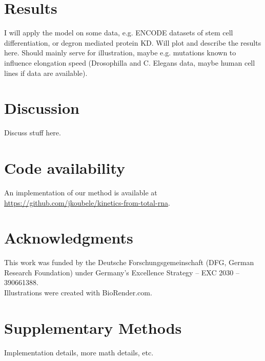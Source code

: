 \documentclass[11pt]{article}
\begin{document}
    \section{Results}
    I will apply the model on some data, e.g. ENCODE datasets of stem cell differentiation, or degron mediated protein KD. Will plot and describe the results here. Should mainly serve for illustration, maybe e.g. mutations known to influence elongation speed (Drosophilla and C. Elegans data, maybe human cell lines if data are available).
 

    \section{Discussion}
    Discuss stuff here.



    \section*{Code availability}
    An implementation of our method is available at \url{https://github.com/jkoubele/kinetics-from-total-rna}.


    \section*{Acknowledgments}
    This work was funded by the Deutsche Forschungsgemeinschaft (DFG, German Research Foundation)
    under Germany's Excellence Strategy – EXC 2030 – 390661388. \\
    Illustrations were created with BioRender.com.


    

    \newpage


    \section*{Supplementary Methods} \label{supplementary_methods}
    Implementation details, more math details, etc.
    
\end{document}
